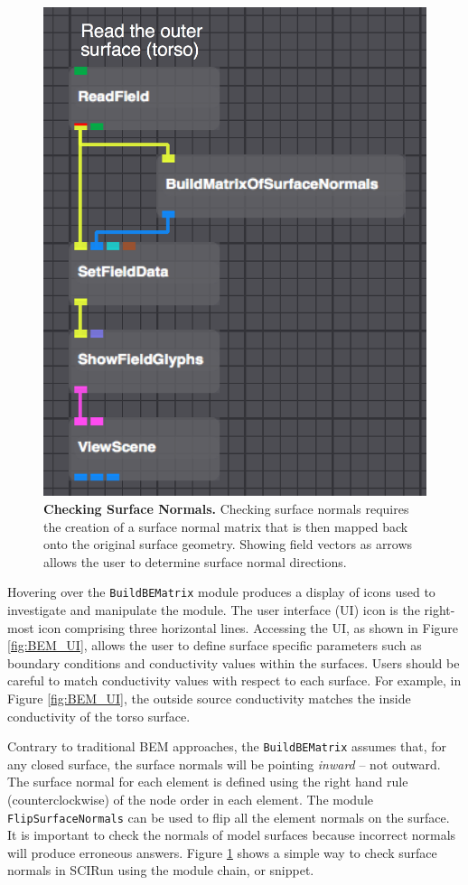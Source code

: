 \begin{figure}
\begin{center}
\includegraphics[width=.45\textwidth]{ECGToolkitGuide_figures/CheckSurfaceNormals.png}
\caption{{\bf Checking Surface Normals.} Checking surface normals requires the creation of a surface normal matrix that is then mapped back onto the original surface geometry. Showing field vectors as arrows allows the user to determine surface normal directions.}
\label{fig:CheckNormals}
\end{center}
\vspace{-.25in}
\end{figure}

Hovering over the {\tt BuildBEMatrix} module produces a display of icons used to investigate and manipulate the module.  
The user interface (UI) icon is the right-most icon comprising three horizontal lines. 
Accessing the UI, as shown in Figure \ref{fig:BEM_UI}, allows the user to define surface specific parameters such as boundary conditions and conductivity values within the surfaces. 
Users should be careful to match conductivity values with respect to each surface. 
For example, in Figure \ref{fig:BEM_UI}, the outside source conductivity matches the inside conductivity of the torso surface. 

Contrary to traditional BEM approaches, the {\tt BuildBEMatrix} assumes that, for any closed surface, the surface normals will be pointing {\em inward} -- not outward. The surface
normal for each element is defined using the right hand rule (counterclockwise) of the node order in each element. 
The module {\tt FlipSurfaceNormals} can be used to flip all the element normals on the surface. 
It is important to check
the normals of model surfaces because incorrect normals will produce erroneous answers. 
Figure \ref{fig:CheckNormals} shows a simple way to check surface normals in SCIRun using the module chain, or snippet.


